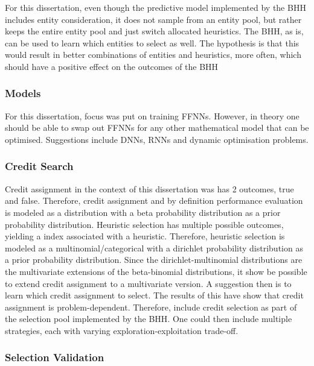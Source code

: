 For this dissertation, even though the predictive model implemented by the \ac{BHH} includes entity consideration, it does not sample from an entity pool, but rather keeps the entire entity pool and just switch allocated heuristics. The \ac{BHH}, as is, can be used to learn which entities to select as well. The hypothesis is that this would result in better combinations of entities and heuristics, more often, which should have a positive effect on the outcomes of the \ac{BHH}

\subsubsection{Models}

For this dissertation, focus was put on training \acp{FFNN}. However, in theory one should be able to swap out \acp{FFNN} for any other mathematical model that can be optimised. Suggestions include \acp{DNN}, \acp{RNN} and dynamic optimisation problems.

\subsubsection{Credit Search}

Credit assignment in the context of this dissertation was has 2 outcomes, true and false. Therefore, credit assignment and by definition performance evaluation is modeled as a  distribution with a beta probability distribution as a prior probability distribution. Heuristic selection has multiple possible outcomes, yielding a index associated with a heuristic. Therefore, heuristic selection is modeled as a multinomial/categorical with a dirichlet probability distribution as a prior probability distribution. Since the dirichlet-multinomial distributions are the multivariate extensions of the beta-binomial distributions, it show be possible to extend credit assignment to a multivariate version. A suggestion then is to learn which credit assignment to select. The results of this have show that credit assignment is problem-dependent. Therefore, include credit selection as part of the selection pool implemented by the \ac{BHH}. One could then include multiple strategies, each with varying exploration-exploitation trade-off.

\subsubsection{Selection Validation}

